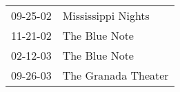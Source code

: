 \begin{supertabular}{p{0.25\columnwidth}p{0.75\columnwidth}}
 09-25-02 &   Mississippi Nights \\
 11-21-02 &        The Blue Note \\
 02-12-03 &        The Blue Note \\
 09-26-03 &  The Granada Theater \\
\end{supertabular}
